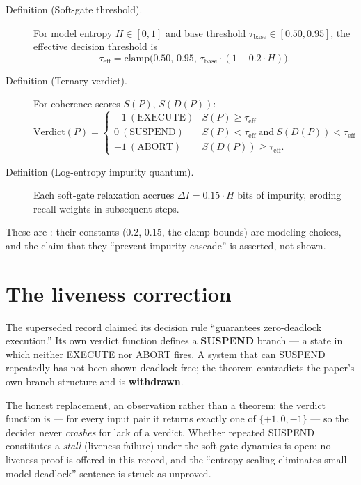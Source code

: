\documentclass{alienfolio}
\begin{document}
\begin{description}
\item[Definition (Soft-gate threshold).] For model entropy
$H \in [0,1]$ and base threshold $\tau_{\mathrm{base}} \in
[0.50, 0.95]$, the effective decision threshold is
\begin{equation}
\tau_{\mathrm{eff}} = \mathrm{clamp}\bigl(0.50,\, 0.95,\,
\tau_{\mathrm{base}}\cdot(1 - 0.2\cdot H)\bigr).
\end{equation}
\item[Definition (Ternary verdict).] For coherence scores $S(P)$,
$S(D(P))$:
\begin{equation}
\mathrm{Verdict}(P) = \left\{\begin{array}{ll}
+1\ \mathrm{(EXECUTE)} & S(P) \ge \tau_{\mathrm{eff}}\\
0\ \mathrm{(SUSPEND)} & S(P) < \tau_{\mathrm{eff}}\ \mathrm{and}\
S(D(P)) < \tau_{\mathrm{eff}}\\
-1\ \mathrm{(ABORT)} & S(D(P)) \ge \tau_{\mathrm{eff}}.
\end{array}\right.
\end{equation}
\item[Definition (Log-entropy impurity quantum).] Each soft-gate
relaxation accrues $\Delta I = 0.15\cdot H$ bits of impurity,
eroding recall weights in subsequent steps.
\end{description}
These are  : their
constants (0.2, 0.15, the clamp bounds) are modeling choices, and the
claim that they ``prevent impurity cascade'' is asserted, not shown.

\section{The liveness correction}
\label{sec:liveness}

The superseded record claimed its decision rule ``guarantees
zero-deadlock execution.'' Its own verdict function defines a
\textbf{SUSPEND} branch --- a state in which neither EXECUTE nor
ABORT fires. A system that can SUSPEND repeatedly has not been shown
deadlock-free; the theorem contradicts the paper's own branch
structure and is \textbf{withdrawn}.

The honest replacement, an observation rather than a theorem: the
verdict function is \key{total} --- for every input pair it returns
exactly one of $\{+1, 0, -1\}$ --- so the decider never
\emph{crashes} for lack of a verdict. Whether repeated SUSPEND
constitutes a \emph{stall} (liveness failure) under the soft-gate
dynamics is \tiertag{conjecture} open: no liveness proof is offered
in this record, and the ``entropy scaling eliminates small-model
deadlock'' sentence is struck as unproved.
\end{document}

